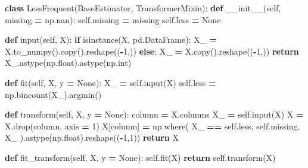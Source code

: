 \documentclass[
]{article}
\newenvironment{Shaded}{\begin{snugshade}}{\end{snugshade}}
\newcommand{\BuiltInTok}[1]{#1}
\newcommand{\ControlFlowTok}[1]{\textcolor[rgb]{0.13,0.29,0.53}{\textbf{#1}}}
\newcommand{\DecValTok}[1]{\textcolor[rgb]{0.00,0.00,0.81}{#1}}
\newcommand{\FunctionTok}[1]{\textcolor[rgb]{0.00,0.00,0.00}{#1}}
\newcommand{\KeywordTok}[1]{\textcolor[rgb]{0.13,0.29,0.53}{\textbf{#1}}}
\newcommand{\NormalTok}[1]{#1}
\newcommand{\OperatorTok}[1]{\textcolor[rgb]{0.81,0.36,0.00}{\textbf{#1}}}
\newcommand{\VariableTok}[1]{\textcolor[rgb]{0.00,0.00,0.00}{#1}}
\begin{document}
\newpage

\begin{Shaded}
\begin{Highlighting}[]
\KeywordTok{class}\NormalTok{ LessFrequent(BaseEstimator, TransformerMixin):}
    \KeywordTok{def} \FunctionTok{\_\_init\_\_}\NormalTok{(}\VariableTok{self}\NormalTok{, missing }\OperatorTok{=}\NormalTok{ np.nan):}
        \VariableTok{self}\NormalTok{.missing }\OperatorTok{=}\NormalTok{ missing}
        \VariableTok{self}\NormalTok{.less }\OperatorTok{=} \VariableTok{None}
    
    \KeywordTok{def} \BuiltInTok{input}\NormalTok{(}\VariableTok{self}\NormalTok{, X):}
        \ControlFlowTok{if} \BuiltInTok{isinstance}\NormalTok{(X, pd.DataFrame):}
\NormalTok{            X\_ }\OperatorTok{=}\NormalTok{ X.to\_numpy().copy().reshape((}\OperatorTok{{-}}\DecValTok{1}\NormalTok{,))}
        \ControlFlowTok{else}\NormalTok{: X\_ }\OperatorTok{=}\NormalTok{ X.copy().reshape((}\OperatorTok{{-}}\DecValTok{1}\NormalTok{,))}
        \ControlFlowTok{return}\NormalTok{ X\_.astype(np.}\BuiltInTok{float}\NormalTok{).astype(np.}\BuiltInTok{int}\NormalTok{)}
    
    \KeywordTok{def}\NormalTok{ fit(}\VariableTok{self}\NormalTok{, X, y }\OperatorTok{=} \VariableTok{None}\NormalTok{):}
\NormalTok{        X\_ }\OperatorTok{=} \VariableTok{self}\NormalTok{.}\BuiltInTok{input}\NormalTok{(X)}
        \VariableTok{self}\NormalTok{.less }\OperatorTok{=}\NormalTok{ np.bincount(X\_).argmin()}
        
    \KeywordTok{def}\NormalTok{ transform(}\VariableTok{self}\NormalTok{, X, y }\OperatorTok{=} \VariableTok{None}\NormalTok{):}
\NormalTok{        column }\OperatorTok{=}\NormalTok{ X.columns}
\NormalTok{        X\_ }\OperatorTok{=} \VariableTok{self}\NormalTok{.}\BuiltInTok{input}\NormalTok{(X)}
\NormalTok{        X }\OperatorTok{=}\NormalTok{ X.drop(column, axis }\OperatorTok{=} \DecValTok{1}\NormalTok{)}
\NormalTok{        X[column] }\OperatorTok{=}\NormalTok{ np.where(}
\NormalTok{            X\_ }\OperatorTok{==} \VariableTok{self}\NormalTok{.less, }\VariableTok{self}\NormalTok{.missing, X\_}
\NormalTok{        ).astype(np.}\BuiltInTok{float}\NormalTok{).reshape((}\OperatorTok{{-}}\DecValTok{1}\NormalTok{,}\DecValTok{1}\NormalTok{))}
        \ControlFlowTok{return}\NormalTok{ X}
    
    \KeywordTok{def}\NormalTok{ fit\_transform(}\VariableTok{self}\NormalTok{, X, y }\OperatorTok{=} \VariableTok{None}\NormalTok{):}
        \VariableTok{self}\NormalTok{.fit(X)}
        \ControlFlowTok{return} \VariableTok{self}\NormalTok{.transform(X)}
\end{Highlighting}
\end{Shaded}
\end{document}
